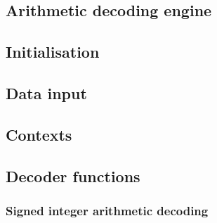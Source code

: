 
\label{arithdecoding}


\subsection{Arithmetic decoding engine}
\subsection{Initialisation}
\subsection{Data input}
\subsection{Contexts}
\subsection{Decoder functions}
\subsubsection{Signed integer arithmetic decoding}
